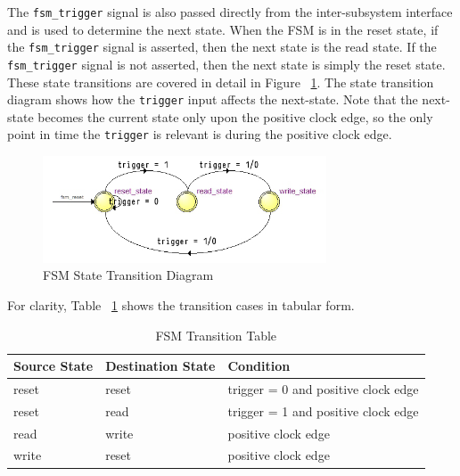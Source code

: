 \documentclass{article}
\begin{document}
The \texttt{fsm\_trigger} signal is also passed directly from the inter-subsystem interface and is used to determine the next state. When the FSM is in the reset state, if the \texttt{fsm\_trigger} signal is asserted, then the next state is the read state. If the \texttt{fsm\_trigger} signal is not asserted, then the next state is simply the reset state. These state transitions are covered in detail in Figure ~\ref{fig:fsm-transition}. The state transition diagram shows how the \texttt{trigger} input affects the next-state. Note that the next-state becomes the current state only upon the positive clock edge, so the only point in time the \texttt{trigger} is relevant is during the positive clock edge.

\begin{figure}[ht!]
  \centering
    \includegraphics[width=0.75\textwidth]{fsm_updated_state_transition_diagram.PNG}
  \caption{FSM State Transition Diagram}
  \label{fig:fsm-transition}
\end{figure}

For clarity, Table ~\ref{tab:fsm-table} shows the transition cases in tabular form.

\begin{table}[ht]
    \begin{center}
        \begin{tabular}{lll}\hline
        Source State & Destination State & Condition \\
        \hline
        reset & reset & trigger = 0 and positive clock edge \\
        \hline
        reset & read & trigger = 1 and positive clock edge \\
        \hline
        read & write & positive clock edge \\
        \hline
        write & reset & positive clock edge \\
        \hline
        \end{tabular}
        \caption{FSM Transition Table}\label{tab:fsm-table}
    \end{center}
\end{table}
\end{document}
